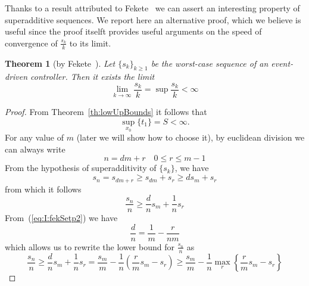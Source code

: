 \documentclass[12pt,draftcls,onecolumn]{IEEEtran} %
\newtheorem{theorem}{Theorem}
\begin{document}
Thanks to a result attributed to Fekete~\cite{Fek23} we can assert an
interesting property of superadditive sequences. We report here an
alternative proof, which we believe is useful since the proof itselft
provides useful arguments on the speed of convergence of $\frac{s_k}k$
to its limit.
\begin{theorem}[by Fekete~\cite{Fek23}]
  Let $\{s_k\}_{k\geq 1}$ be the worst-case sequence of an
  event-driven controller. Then it exists the limit
  \begin{equation*}
    \lim_{k\to\infty}\frac{s_k}k =\sup\frac{s_k}k < \infty
  \end{equation*}
  \label{th:I:fekete}
\end{theorem}
\begin{proof}
  From Theorem~\ref{th:lowUpBounds} it follows that
  \begin{equation*}
    \sup_{x_0}\{t_1\}=S<\infty.
  \end{equation*}
  For any value of $m$ (later we will show how to choose it), by
  euclidean division we can always write
  \begin{equation}
    n=dm+r\quad 0\leq r \leq m-1
    \label{eq:I:fekSetp2}
  \end{equation}
  From the hypothesis of superadditivity of $\{s_k\}$, we have
  \begin{equation*}
    s_n =s_{dm+r} \geq s_{dm}+s_r \geq ds_m+s_r
  \end{equation*}
  from which it follows
  \begin{equation*}
  \frac{s_n}n \geq \frac d n s_m +\frac 1 n s_r
  \end{equation*}
  From~(\ref{eq:I:fekSetp2}) we have
  \begin{equation*}
    \frac d n = \frac 1 m - \frac{r}{nm}
  \end{equation*}
  which allows us to rewrite the lower bound for $\frac{s_n}n$ as
  \begin{equation}
    \frac{s_n}n \geq \frac d n s_m +\frac 1 n s_r = 
    \frac{s_m}m -\frac 1 n\left(\frac r m s_m-s_r\right)
    \geq
    \frac{s_m}m -\frac 1 n\max_r\left\{\frac r m s_m-s_r\right\}
    \label{eq:I:beforeBranch}
  \end{equation}


\end{proof}
\end{document}
